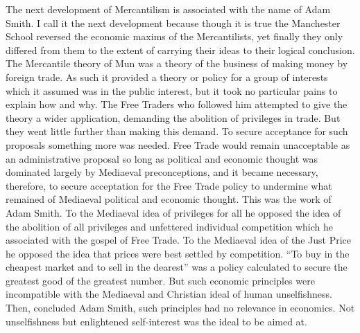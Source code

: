 \documentclass{book}
\begin{document}
The next development of Mercantilism is associated with the name of Adam Smith. I call it the next development because though it is true the Manchester School reversed the economic maxims of the Mercantilists, yet finally they only differed from them to the extent of carrying their ideas to their logical conclusion. The Mercantile theory of Mun was a theory of the business of making money by foreign trade. As such it provided a theory or policy for a group of interests which it assumed was in the public interest, but it took no particular pains to explain how and why. The Free Traders who followed him attempted to give the theory a wider application, demanding the abolition of privileges in trade. But they went little further than making this demand. To secure acceptance for such proposals something more was needed. Free Trade would remain unacceptable as an administrative proposal so long as political and economic thought was dominated largely by Mediaeval preconceptions, and it became necessary, therefore, to secure acceptation for the Free Trade policy to undermine what remained of Mediaeval political and economic thought. This was the work of Adam Smith. To the Mediaeval idea of privileges for all he opposed the idea of the abolition of all privileges and unfettered individual competition which he associated with the gospel of Free Trade. To the Mediaeval idea of the Just Price he opposed the idea that prices were best settled by competition. “To buy in the cheapest market and to sell in the dearest” was a policy calculated to secure the greatest good of the greatest number. But such economic principles were incompatible with the Mediaeval and Christian ideal of human unselfishness. Then, concluded Adam Smith, such principles had no relevance in economics. Not unselfishness but enlightened self-interest was the ideal to be aimed at.
\end{document}

